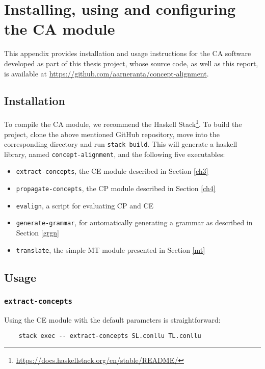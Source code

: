 \chapter{Installing, using and configuring the CA module} \label{b}
This appendix provides installation and usage instructions for the CA software developed as part of this thesis project, whose source code, as well as this report, is available at \url{https://github.com/aarneranta/concept-alignment}.

\section{Installation}
To compile the CA module, we recommend the Haskell Stack\footnote{\url{https://docs.haskellstack.org/en/stable/README/}}. 
To build the project, clone the above mentioned GitHub repository, move into the corresponding directory and run \texttt{stack build}. 
This will generate a haskell library, named \texttt{concept-alignment}, and the following five executables: \smallskip

\begin{itemize}
    \item \texttt{extract-concepts}, the CE module described in Section \ref{ch3}
    \item \texttt{propagate-concepts}, the CP module described in Section \ref{ch4}
    \item \texttt{evalign}, a script for evaluating CP and CE
    \item \texttt{generate-grammar}, for automatically generating a grammar as described in Section \ref{grgn}
    \item \texttt{translate}, the simple MT module presented in Section \ref{mt}
\end{itemize}

\section{Usage}
\subsection{\texttt{extract-concepts}}
Using the CE module with the default parameters is straightforward: \smallskip

\begin{verbatim}
    stack exec -- extract-concepts SL.conllu TL.conllu
\end{verbatim} \smallskip

